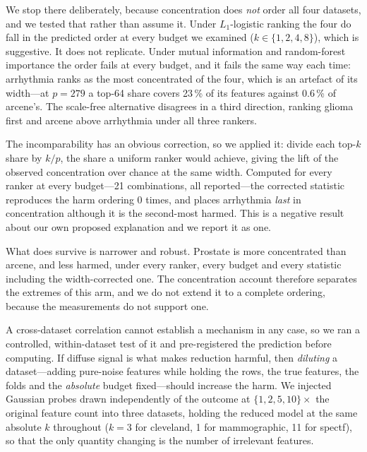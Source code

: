 \documentclass[fleqn,10pt]{wlscirep}
\newcommand{\result}[1]{#1}
\begin{document}
We stop there deliberately, because concentration does \emph{not} order all four datasets, and we
tested that rather than assume it. Under $L_1$-logistic ranking the four do fall in the predicted
order at every budget we examined ($k\in\{1,2,4,8\}$), which is suggestive. It does not replicate. Under
mutual information and random-forest importance the order fails at every budget, and it fails the same
way each time: arrhythmia ranks as the most concentrated of the four, which is an artefact of its
width---at $p=\result{279}$ a top-\result{64} share covers \result{23\,\%} of its features against
\result{0.6\,\%} of arcene's. The scale-free alternative disagrees in a third direction, ranking
glioma first and arcene above arrhythmia under all three rankers.

The incomparability has an obvious correction, so we applied it: divide each top-$k$ share by
$k/p$, the share a uniform ranker would achieve, giving the lift of the observed concentration over
chance at the same width. Computed for every ranker at every budget---\result{21} combinations, all
reported---the corrected statistic reproduces the harm ordering \result{0} times, and places
arrhythmia \emph{last} in concentration although it is the second-most harmed. This is a negative
result about our own proposed explanation and we report it as one.

What does survive is narrower and robust. Prostate is more concentrated than arcene, and less harmed,
under every ranker, every budget and every statistic including the width-corrected one. The
concentration account therefore separates the extremes of this arm, and we do not extend it to a
complete ordering, because the measurements do not support one.

A cross-dataset correlation cannot establish a mechanism in any case, so we ran a controlled,
within-dataset test of it and pre-registered the prediction before computing. If diffuse signal is what
makes reduction harmful, then \emph{diluting} a dataset---adding pure-noise features while holding the
rows, the true features, the folds and the \emph{absolute} budget fixed---should increase the harm. We
injected Gaussian probes drawn independently of the outcome at $\{1,2,5,10\}\times$ the original
feature count into three datasets, holding the reduced model at the same absolute $k$ throughout
($k=\result{3}$ for cleveland, \result{1} for mammographic, \result{11} for spectf), so that the only
quantity changing is the number of irrelevant features.
\end{document}
